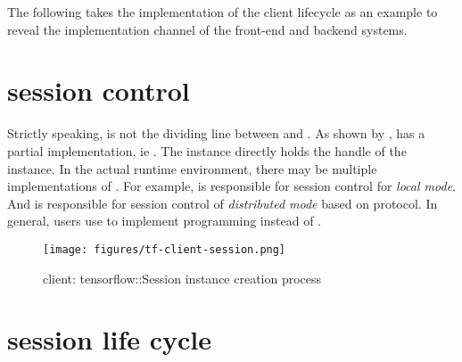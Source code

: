 \begin{content}
The following takes the implementation of the client lifecycle as an example to reveal the implementation channel of the front-end  and backend \cpp{} systems.

\end{content}

\section{session control}

\begin{content}

Strictly speaking,  is not the dividing line between  and . As shown by ,  has a partial \cpp{} implementation, ie . The  instance directly holds the handle of the  instance. In the actual runtime environment, there may be multiple implementations of . For example,  is responsible for session control for \emph{local mode}. And  is responsible for session control of \emph{distributed mode} based on  protocol. In general, users use  to implement programming instead of .

\begin{figure}[!htbp]
\centering
\texttt{[image: figures/tf-client-session.png]}
\caption{client: tensorflow::Session instance creation process}
 \label{fig:tf-client-session}
\end{figure}

\end{content}

\section{session life cycle}

